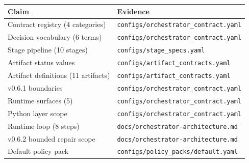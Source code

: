 \documentclass[11pt,a4paper]{article}
\begin{document}
\begin{table}[ht]
\centering
\footnotesize
\begin{tabular}{@{}ll@{}}
\toprule
\textbf{Claim} & \textbf{Evidence} \\
\midrule
Contract registry (4 categories) & \texttt{configs/orchestrator\_contract.yaml} \\
Decision vocabulary (6 terms) & \texttt{configs/orchestrator\_contract.yaml} \\
Stage pipeline (10 stages) & \texttt{configs/stage\_specs.yaml} \\
Artifact status values & \texttt{configs/artifact\_contracts.yaml} \\
Artifact definitions (11 artifacts) & \texttt{configs/artifact\_contracts.yaml} \\
v0.6.1 boundaries & \texttt{configs/orchestrator\_contract.yaml} \\
Runtime surfaces (5) & \texttt{configs/orchestrator\_contract.yaml} \\
Python layer scope & \texttt{configs/orchestrator\_contract.yaml} \\
Runtime loop (8 steps) & \texttt{docs/orchestrator-architecture.md} \\
v0.6.2 bounded repair scope & \texttt{docs/orchestrator-architecture.md} \\
Default policy pack & \texttt{configs/policy\_packs/default.yaml} \\
\bottomrule
\end{tabular}
\end{table}

\printbibliography[title={References}]
\end{document}

